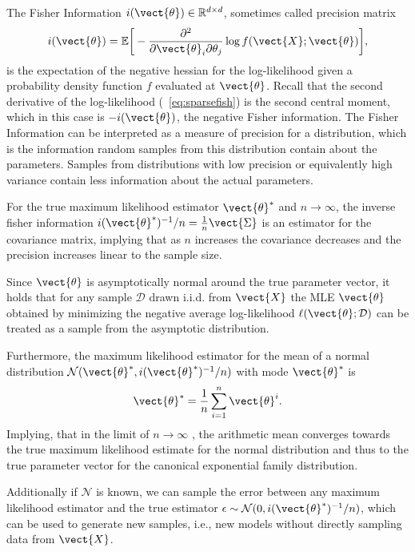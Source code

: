         The Fisher Information $i(\vect{\theta}) \in \mathbb{R}^{d \times d}$, sometimes called precision matrix
        \begin{equation*}
            i(\vect{\theta}) = \mathbb{E}\bigg[- \frac{\partial^2}{\partial \vect{\theta}_i \partial \theta_j} \log f(\vect{X}; \vect{\theta})\bigg] ,
        \end{equation*} 
        is the expectation of the negative hessian for the log-likelihood given a probability density function $f$ evaluated at $\vect{\theta}$.
        Recall that the second derivative of the log-likelihood (\eq~\ref{eq:sparsefish}) is the second central moment, which in this case is $-i(\vect{\theta})$, the negative Fisher information.
        The Fisher Information can be interpreted as a measure of precision for a distribution, which is the information random samples from this distribution contain about the parameters.
        Samples from distributions with low precision or equivalently high variance contain less information about the actual parameters.

        For the true maximum likelihood estimator $\vect{\theta}^*$  and $n \rightarrow \infty$, the inverse fisher information $i(\vect{\theta}^*)^{-1}/ n = \frac{1}{n} \vect{\Sigma}$ is an estimator for the covariance matrix, implying that as $n$ increases the covariance decreases and the precision increases linear to the sample size.

        Since $\vect{\theta}$ is asymptotically normal around the true parameter vector, it holds that for any sample $\mathcal{D}$ drawn i.i.d. from $\vect{X}$ the MLE $\vect{\theta}$ obtained by minimizing the negative average log-likelihood $\ell(\vect{\theta}; \mathcal{D})$ can be treated as a sample from the asymptotic distribution.

        Furthermore, the maximum likelihood estimator for the mean of a normal distribution $\mathcal{N}(\vect{\theta}^*, i(\vect{\theta}^*)^{-1}/n)$ with mode $\vect{\theta}^*$ is
        \begin{equation}
            \vect{\theta}^* = \frac{1}{n} \sum_{i=1}^n \vect{\theta}^{i}.
        \end{equation}
        Implying, that in the limit of $n \rightarrow \infty$ , the arithmetic mean converges towards the true maximum likelihood estimate for the normal distribution and thus to the true parameter vector for the canonical exponential family distribution.
        
        Additionally if $\mathcal{N}$ is known, we can sample the error between any maximum likelihood estimator and the true estimator $\epsilon \sim \mathcal{N}(0, i(\vect{\theta}^*)^{-1}/n)$, which can be used to generate new samples, i.e., new models without directly sampling data from $\vect{X}$.

